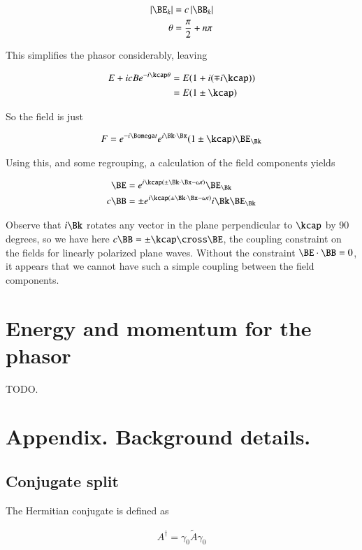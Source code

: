 \begin{align*}
\Abs{\BE_k} &= c \Abs{\BB_k} \\
\theta &= \frac{\pi}{2} + n \pi
\end{align*}

This simplifies the phasor considerably, leaving

\begin{align*}
E + i c B e^{-i\kcap \theta}
&=
E(1 + i (\mp i\kcap )) \\
&=
E(1 \pm \kcap)
\end{align*}

So the field is just

\begin{align}
F = e^{-i \Bomega t} e^{i \Bk \cdot \Bx} (1 \pm \kcap) \BE_\Bk
\end{align}

Using this, and some regrouping, a calculation of the field components yields

\begin{align}
\BE &= e^{i \kcap( \pm \Bk \cdot \Bx -\omega t )} \BE_\Bk \\
c \BB &= \pm e^{i \kcap( \pm \Bk \cdot \Bx -\omega t )} i \Bk \BE_\Bk
\end{align}

Observe that $i\Bk$ rotates any vector in the plane perpendicular to $\kcap$ by 90 degrees, so we have here $c \BB = \pm \kcap \cross \BE$, the coupling constraint on the fields for linearly polarized plane waves.  Without the constraint $\BE \cdot \BB = 0$, it appears that we cannot have such a simple coupling between the field components.

\section{Energy and momentum for the phasor}

TODO.

\section{Appendix.  Background details.}

\subsection{Conjugate split}

The Hermitian conjugate is defined as

\begin{align}
A^\dagger = \gamma_0 \tilde{A} \gamma_0
\end{align}


